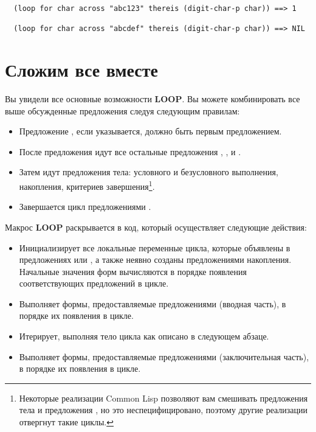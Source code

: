 \begin{lstlisting}
  (loop for char across "abc123" thereis (digit-char-p char)) ==> 1

  (loop for char across "abcdef" thereis (digit-char-p char)) ==> NIL
\end{lstlisting}

\section{Сложим все вместе}

Вы увидели все основные возможности \textbf{LOOP}. Вы можете комбинировать все выше обсужденные предложения следуя следующим правилам:

\begin{itemize}
\item Предложение , если указывается, должно быть первым предложением.
\item После предложения  идут все остальные предложения ,
  ,  и .
\item Затем идут предложения тела: условного и безусловного выполнения, накопления,
  критериев завершения\footnote{Некоторые реализации Common Lisp позволяют вам смешивать
    предложения тела и предложения , но это неспецифицировано, поэтому другие
    реализации отвергнут такие циклы.}.
\item Завершается цикл предложениями .
\end{itemize}

Макрос \textbf{LOOP} раскрывается в код, который осуществляет следующие действия:

\begin{itemize}
\item Инициализирует все локальные переменные цикла, которые объявлены в предложениях
   или , а также неявно созданы предложениями накопления. Начальные
  значения форм вычисляются в порядке появления соответствующих предложений в цикле.
\item Выполняет формы, предоставляемые предложениями  (вводная часть), в
  порядке их появления в цикле.
\item Итерирует, выполняя тело цикла как описано в следующем абзаце.
\item Выполняет формы, предоставляемые предложениями  (заключительная
  часть), в порядке их появления в цикле.
\end{itemize}

